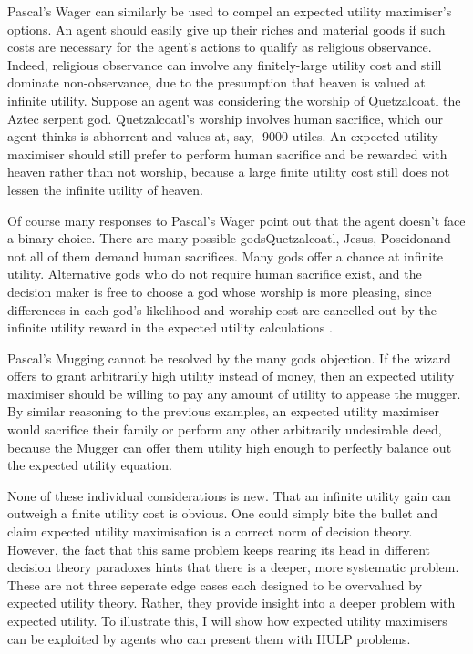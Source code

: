 \documentclass{article}
\begin{document}
Pascal's Wager can similarly be used to compel an expected utility maximiser's options. An agent should easily give up their riches and material goods if such costs are necessary for the agent's actions to qualify as religious observance. Indeed, religious observance can involve any finitely-large utility cost and still dominate non-observance, due to the presumption that heaven is valued at infinite utility. Suppose an agent was considering the worship of Quetzalcoatl the Aztec serpent god. Quetzalcoatl's worship involves human sacrifice, which our agent thinks is abhorrent and values at, say, -9000 utiles. An expected utility maximiser should still prefer to perform human sacrifice and be rewarded with heaven rather than not worship, because a large finite utility cost still does not lessen the infinite utility of heaven. 

Of course many responses to Pascal's Wager point out that the agent doesn't face a binary choice. There are many possible gods\textemdash Quetzalcoatl, Jesus, Poseidon\textemdash and not all of them demand human sacrifices. Many gods offer a chance at infinite utility. Alternative gods who do not require human sacrifice exist, and the decision maker is free to choose a god whose worship is more pleasing, since differences in each god's likelihood and worship-cost are cancelled out by the infinite utility reward in the expected utility calculations \citep{diderot1746pensees}.

Pascal's Mugging cannot be resolved by the many gods objection. If the wizard offers to grant arbitrarily high utility instead of money, then an expected utility maximiser should be willing to pay any amount of utility to appease the mugger. By similar reasoning to the previous examples, an expected utility maximiser would sacrifice their family or perform any other arbitrarily undesirable deed, because the Mugger can offer them utility high enough to perfectly balance out the expected utility equation.

None of these individual considerations is new. That an infinite utility gain can outweigh a finite utility cost is obvious. One could simply bite the bullet and claim expected utility maximisation is a correct norm of decision theory. However, the fact that this same problem keeps rearing its head in different decision theory paradoxes hints that there is a deeper, more systematic problem. These are not three seperate edge cases each designed to be overvalued by expected utility theory. Rather, they provide insight into a deeper problem with expected utility. To illustrate this, I will show how expected utility maximisers can be exploited by agents who can present them with HULP problems.
\end{document}
